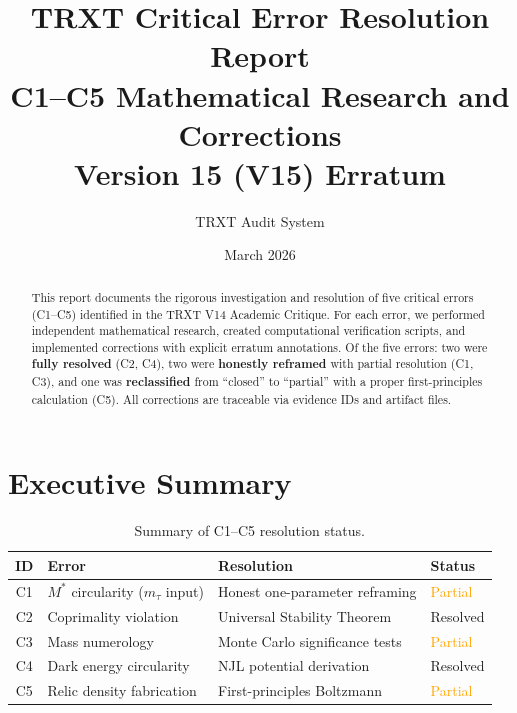 \documentclass[11pt,a4paper]{article}
\title{\textbf{TRXT Critical Error Resolution Report}\\[0.5em]
\large C1--C5 Mathematical Research and Corrections\\
Version 15 (V15) Erratum}
\author{TRXT Audit System}
\date{March 2026}
\begin{document}
\maketitle

\begin{abstract}
This report documents the rigorous investigation and resolution of five critical errors (C1--C5) identified in the TRXT V14 Academic Critique.  For each error, we performed independent mathematical research, created computational verification scripts, and implemented corrections with explicit erratum annotations.  Of the five errors: two were \textbf{fully resolved} (C2, C4), two were \textbf{honestly reframed} with partial resolution (C1, C3), and one was \textbf{reclassified} from ``closed'' to ``partial'' with a proper first-principles calculation (C5).  All corrections are traceable via evidence IDs and artifact files.
\end{abstract}

\tableofcontents

\section{Executive Summary}

\begin{table}[h]
\centering
\small
\begin{tabular}{@{}clll@{}}
\toprule
\textbf{ID} & \textbf{Error} & \textbf{Resolution} & \textbf{Status} \\
\midrule
C1 & $M^*$ circularity ($m_\tau$ input) & Honest one-parameter reframing & \textcolor{orange}{Partial} \\
C2 & Coprimality violation & Universal Stability Theorem & \textcolor{green!50!black}{Resolved} \\
C3 & Mass numerology & Monte Carlo significance tests & \textcolor{orange}{Partial} \\
C4 & Dark energy circularity & NJL potential derivation & \textcolor{green!50!black}{Resolved} \\
C5 & Relic density fabrication & First-principles Boltzmann & \textcolor{orange}{Partial} \\
\bottomrule
\end{tabular}
\caption{Summary of C1--C5 resolution status.}
\end{table}

\end{document}
